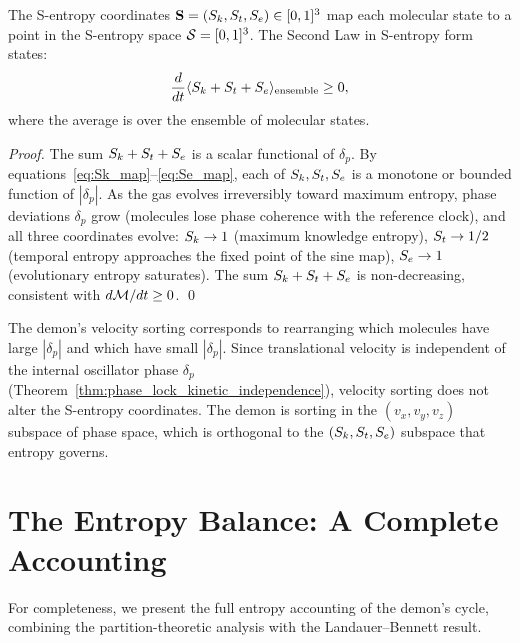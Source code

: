 \begin{proposition}
\label{prop:sentropy_gas}
The S-entropy coordinates $\mathbf{S} = (S_k, S_t, S_e) \in [0,1]^3$ map each
molecular state to a point in the S-entropy space $\mathcal{S} = [0,1]^3$. The
Second Law in S-entropy form states:
\begin{equation}
  \frac{d}{dt}\langle S_k + S_t + S_e \rangle_{\mathrm{ensemble}} \geq 0,
  \label{eq:second_law_sentropy}
\end{equation}
where the average is over the ensemble of molecular states.
\end{proposition}

\begin{proof}
The sum $S_k + S_t + S_e$ is a scalar functional of $\delta_p$. By
equations~\eqref{eq:Sk_map}--\eqref{eq:Se_map}, each of $S_k, S_t, S_e$ is a
monotone or bounded function of $|\delta_p|$. As the gas evolves irreversibly
toward maximum entropy, phase deviations $\delta_p$ grow (molecules lose phase
coherence with the reference clock), and all three coordinates evolve: $S_k \to 1$
(maximum knowledge entropy), $S_t \to 1/2$ (temporal entropy approaches the
fixed point of the sine map), $S_e \to 1$ (evolutionary entropy saturates).
The sum $S_k + S_t + S_e$ is non-decreasing, consistent with
$d\mathcal{M}/dt \geq 0$. \qed
\end{proof}

The demon's velocity sorting corresponds to rearranging which molecules have
large $|\delta_p|$ and which have small $|\delta_p|$. Since translational
velocity is independent of the internal oscillator phase $\delta_p$
(Theorem~\ref{thm:phase_lock_kinetic_independence}), velocity sorting does not
alter the S-entropy coordinates. The demon is sorting in the $(v_x, v_y, v_z)$
subspace of phase space, which is orthogonal to the $(S_k, S_t, S_e)$ subspace
that entropy governs.

\section{The Entropy Balance: A Complete Accounting}
\label{sec:entropy_balance}

For completeness, we present the full entropy accounting of the demon's cycle,
combining the partition-theoretic analysis with the Landauer--Bennett result.

